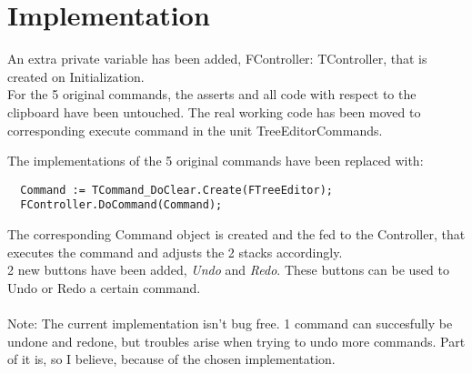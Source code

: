 \documentclass[]{article}
\begin{document}


\section{Implementation} %
\label{sec:implemantation}
An extra private variable has been added, FController: TController, that is created on Initialization. \\
For the 5 original commands, the asserts and all code with respect to the clipboard have been untouched. The real working code has been moved to corresponding execute command in the unit TreeEditorCommands. 

The implementations of the 5 original commands have been replaced with:
\begin{verbatim}
  Command := TCommand_DoClear.Create(FTreeEditor);
  FController.DoCommand(Command);
\end{verbatim}
The corresponding Command object is created and the fed to the Controller, that executes the command and adjusts the 2 stacks accordingly.\\
2 new buttons have been added, \emph{Undo} and \emph{Redo}. These buttons can be used to Undo or Redo a certain command. 
\\ \\Note: The current implementation isn't bug free. 1 command can succesfully be undone and redone, but troubles arise when trying to undo more commands. Part of it is, so I believe, because of the chosen implementation.



\end{document}

